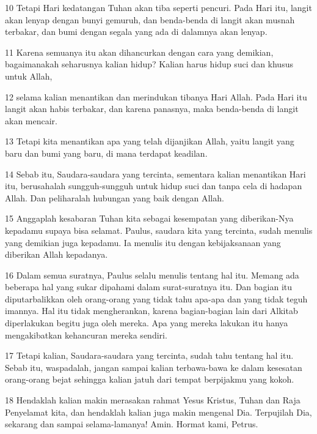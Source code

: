 \par 10 Tetapi Hari kedatangan Tuhan akan tiba seperti pencuri. Pada Hari itu, langit akan lenyap dengan bunyi gemuruh, dan benda-benda di langit akan musnah terbakar, dan bumi dengan segala yang ada di dalamnya akan lenyap.
\par 11 Karena semuanya itu akan dihancurkan dengan cara yang demikian, bagaimanakah seharusnya kalian hidup? Kalian harus hidup suci dan khusus untuk Allah,
\par 12 selama kalian menantikan dan merindukan tibanya Hari Allah. Pada Hari itu langit akan habis terbakar, dan karena panasnya, maka benda-benda di langit akan mencair.
\par 13 Tetapi kita menantikan apa yang telah dijanjikan Allah, yaitu langit yang baru dan bumi yang baru, di mana terdapat keadilan.
\par 14 Sebab itu, Saudara-saudara yang tercinta, sementara kalian menantikan Hari itu, berusahalah sungguh-sungguh untuk hidup suci dan tanpa cela di hadapan Allah. Dan peliharalah hubungan yang baik dengan Allah.
\par 15 Anggaplah kesabaran Tuhan kita sebagai kesempatan yang diberikan-Nya kepadamu supaya bisa selamat. Paulus, saudara kita yang tercinta, sudah menulis yang demikian juga kepadamu. Ia menulis itu dengan kebijaksanaan yang diberikan Allah kepadanya.
\par 16 Dalam semua suratnya, Paulus selalu menulis tentang hal itu. Memang ada beberapa hal yang sukar dipahami dalam surat-suratnya itu. Dan bagian itu diputarbalikkan oleh orang-orang yang tidak tahu apa-apa dan yang tidak teguh imannya. Hal itu tidak mengherankan, karena bagian-bagian lain dari Alkitab diperlakukan begitu juga oleh mereka. Apa yang mereka lakukan itu hanya mengakibatkan kehancuran mereka sendiri.
\par 17 Tetapi kalian, Saudara-saudara yang tercinta, sudah tahu tentang hal itu. Sebab itu, waspadalah, jangan sampai kalian terbawa-bawa ke dalam kesesatan orang-orang bejat sehingga kalian jatuh dari tempat berpijakmu yang kokoh.
\par 18 Hendaklah kalian makin merasakan rahmat Yesus Kristus, Tuhan dan Raja Penyelamat kita, dan hendaklah kalian juga makin mengenal Dia. Terpujilah Dia, sekarang dan sampai selama-lamanya! Amin. Hormat kami, Petrus.


